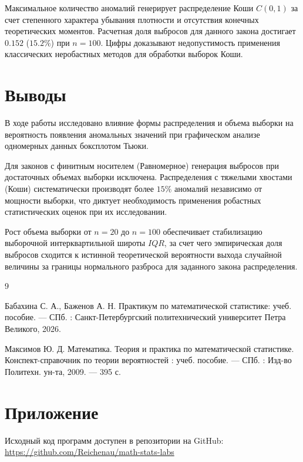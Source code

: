\documentclass[a4paper, 14pt]{extarticle}
\begin{document}
Максимальное количество аномалий генерирует распределение Коши $C(0, 1)$ за счет степенного характера убывания плотности и отсутствия конечных теоретических моментов. Расчетная доля выбросов для данного закона достигает $0.152$ ($15.2\%$) при $n=100$. Цифры доказывают недопустимость применения классических неробастных методов для обработки выборок Коши.

\section{Выводы}

В ходе работы исследовано влияние формы распределения и объема выборки на вероятность появления аномальных значений при графическом анализе одномерных данных боксплотом Тьюки. 

Для законов с финитным носителем (Равномерное) генерация выбросов при достаточных объемах выборки исключена. Распределения с тяжелыми хвостами (Коши) систематически производят более $15\%$ аномалий независимо от мощности выборки, что диктует необходимость применения робастных статистических оценок при их исследовании.

Рост объема выборки от $n=20$ до $n=100$ обеспечивает стабилизацию выборочной интерквартильной широты $IQR$, за счет чего эмпирическая доля выбросов сходится к истинной теоретической вероятности выхода случайной величины за границы нормального разброса для заданного закона распределения.

\renewcommand{\refname}{\thesection\ Список литературы}

\begin{thebibliography}{9}

    Бабахина С. А., Баженов А. Н. Практикум по математической статистике: учеб. пособие. — СПб. : Санкт-Петербургский политехнический университет Петра Великого, 2026. 

    Максимов Ю. Д. Математика. Теория и практика по математической статистике. Конспект-справочник по теории вероятностей : учеб. пособие. — СПб. : Изд-во Политехн. ун-та, 2009. — 395 с. 

\end{thebibliography}

\section{Приложение}

Исходный код программ доступен в репозитории на GitHub: \\
\url{https://github.com/Reichenau/math-stats-labs}
 
\end{document}
